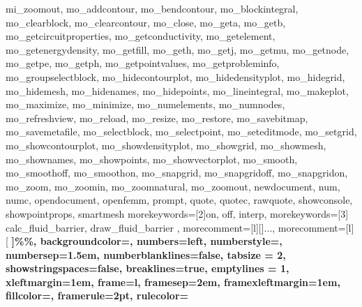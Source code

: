 {{mi_zoomout, 
mo_addcontour, 
mo_bendcontour, 
mo_blockintegral, 
mo_clearblock, 
mo_clearcontour, 
mo_close, 
mo_geta, 
mo_getb, 
mo_getcircuitproperties, 
mo_getconductivity, 
mo_getelement, 
mo_getenergydensity, 
mo_getfill, 
mo_geth, 
mo_getj, 
mo_getmu, 
mo_getnode, 
mo_getpe, 
mo_getph, 
mo_getpointvalues, 
mo_getprobleminfo, 
mo_groupselectblock, 
mo_hidecontourplot, 
mo_hidedensityplot, 
mo_hidegrid, 
mo_hidemesh, 
mo_hidenames, 
mo_hidepoints, 
mo_lineintegral, 
mo_makeplot, 
mo_maximize, 
mo_minimize, 
mo_numelements, 
mo_numnodes, 
mo_refreshview, 
mo_reload, 
mo_resize, 
mo_restore, 
mo_savebitmap, 
mo_savemetafile, 
mo_selectblock, 
mo_selectpoint, 
mo_seteditmode, 
mo_setgrid, 
mo_showcontourplot, 
mo_showdensityplot, 
mo_showgrid, 
mo_showmesh, 
mo_shownames, 
mo_showpoints, 
mo_showvectorplot, 
mo_smooth, 
mo_smoothoff, 
mo_smoothon, 
mo_snapgrid, 
mo_snapgridoff, 
mo_snapgridon, 
mo_zoom, 
mo_zoomin, 
mo_zoomnatural, 
mo_zoomout, 
newdocument, 
num, 
numc, 
opendocument, 
openfemm, 
prompt, 
quote, 
quotec, 
rawquote, 
showconsole, 
showpointprops, 
smartmesh
        }
        morekeywords=[2]{on, off, interp},
        morekeywords=[3]{
calc_fluid_barrier,
draw_fluid_barrier
},
        morecomment=[l][\color{Blue}]{...},     %
        morecomment=[l]%
[%
\color{MyDarkGreen}%
\small\bfseries%
]{\%\%},     %
		backgroundcolor=\color{VlightBlue},
    numbers=left,%
    numberstyle={\scriptsize\ttfamily\color{gray}},%
    numbersep=1.5em,
    numberblanklines=false,
    tabsize = 2,
    showstringspaces=false,
    breaklines=true,
    emptylines = 1,
    xleftmargin=1em,
    frame=l,
    framesep=2em,
    framexleftmargin=1em,%
    fillcolor=\color{VlightBlue!94!MyDarkBlue},
    framerule=2pt,
    rulecolor=\color{Maroon}
}

\makeatletter
\lst@CCPutMacro{}
\@empty\z@\@empty
\makeatother

